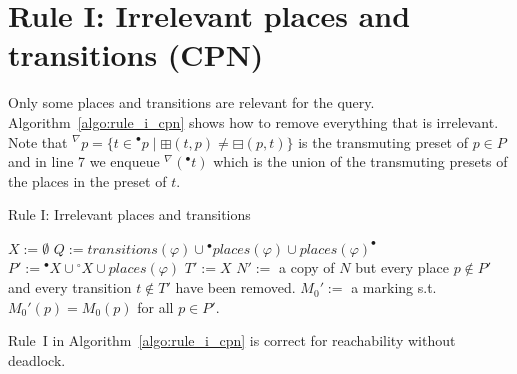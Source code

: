 \section*{Rule I: Irrelevant places and transitions (CPN)}\label{sec:rule_i_cpn}
Only some places and transitions are relevant for the query.
Algorithm~\ref{algo:rule_i_cpn} shows how to remove everything that is irrelevant.
Note that ${}^\nabla p=\{t\in {}^\bullet p\mid\boxplus(t,p)\neq\boxminus(p,t)\}$ is the transmuting preset of $p\in P$ and
in line 7 we enqueue ${}^\nabla({}^\bullet t)$ which is the union of the transmuting presets of the places in the preset of $t$.

\begin{algorithm}
    \vspace{0.2cm}
    \caption{Rule I: Irrelevant places and transitions}
    \label{algo:rule_i_cpn}
    \DontPrintSemicolon
    \LinesNumbered
    \vspace{1mm}
    $X:=\emptyset$
    $Q:=transitions(\varphi)\cup{}^\bullet places(\varphi)\cup places(\varphi)^\bullet$
    $P':={}^\bullet X\cup {}^\circ X\cup places(\varphi)$\;
    $T':=X$\;
    $N':=$ a copy of $N$ but every place $p\notin P'$ and every transition $t\notin T'$ have been removed.\;
    $M_0':=$ a marking s.t.\ $M_0'(p)=M_0(p)$ for all $p\in P'$.\;
    \vspace{0.2cm}
\end{algorithm}

\begin{theorem}
    Rule~I in Algorithm~\ref{algo:rule_i_cpn} is correct for reachability without deadlock.
\end{theorem}